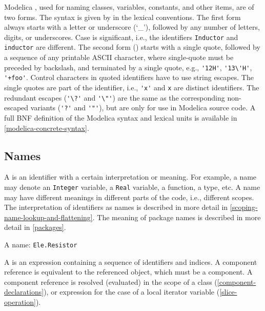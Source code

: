Modelica , used for naming classes, variables, constants, and other items, are of two forms.
The syntax is given by  in the lexical conventions.
The first form always starts with a letter or underscore (`\_'), followed by any number of letters, digits, or underscores.
Case is significant, i.e., the identifiers \lstinline!Inductor! and \lstinline!inductor! are different.
The second form () starts with a single quote, followed by a sequence of any printable ASCII character, where single-quote must be preceded by backslash, and terminated by a single quote, e.g., \lstinline!'12H'!, \lstinline!'13\'H'!, \lstinline!'+foo'!.
Control characters in quoted identifiers have to use string escapes.
The single quotes are part of the identifier, i.e., \lstinline!'x'! and \lstinline!x! are distinct identifiers.
The redundant escapes (\lstinline!'\?'! and \lstinline!'\"'!) are the same as the corresponding non-escaped variants (\lstinline!'?'! and \lstinline!'"'!), but are only for use in Modelica source code.
A full BNF definition of the Modelica syntax and lexical units is available in \cref{modelica-concrete-syntax}.


\subsection{Names}\label{names}

A  is an identifier with a certain interpretation or meaning.
For example, a name may denote an \lstinline!Integer! variable, a \lstinline!Real! variable, a function, a type, etc.
A name may have different meanings in different parts of the code, i.e., different scopes.
The interpretation of identifiers as names is described in more detail in \cref{scoping-name-lookup-and-flattening}.
The meaning of package names is described in more detail in \cref{packages}.

\begin{example}
A name: \lstinline!Ele.Resistor!
\end{example}

A  is an expression containing a sequence of identifiers and indices.
A component reference is equivalent to the referenced object, which must be a component.
A component reference is resolved (evaluated) in the scope of a class (\cref{component-declarations}), or expression for the case of a local iterator variable (\cref{slice-operation}).

